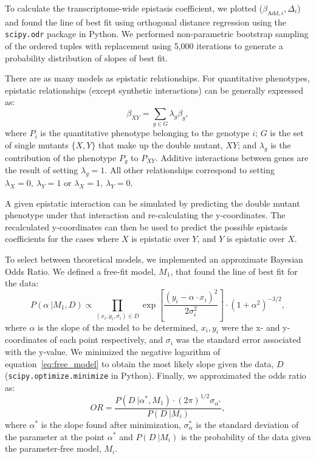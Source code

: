 \documentclass[9pt,twocolumn,twoside,lineno]{pnas-new}
\begin{document}
{To calculate the transcriptome-wide epistasis coefficient, we plotted
($\beta_{\mathrm{Add},i}, \Delta_i$) and found the line of best fit using
orthogonal distance regression using the \texttt{scipy.odr} package in Python.
We performed non-parametric bootstrap sampling of the ordered tuples with
replacement using 5,000 iterations to generate a probability distribution of
slopes of best fit.

There are as many models as epistatic relationships. For quantitative phenotypes,
epistatic relationships (except synthetic interactions) can be generally expressed
as:
\begin{equation}
  \beta_{XY} = \sum_{g\in G} \lambda_g \beta_g,
  \label{eq:epi}
\end{equation}
where $P_i$ is the quantitative phenotype belonging to the genotype $i$; $G$ is
the set of single mutants $\{X, Y\}$ that make up the double mutant, $XY$; and
$\lambda_g$ is the contribution of the phenotype $P_g$ to $P_{XY}$. Additive
interactions between genes are the result of setting $\lambda_g=1$. All other
relationships correspond to setting  $\lambda_X=0,~\lambda_Y=1$ or
$\lambda_X=1,~\lambda_Y=0$.

A given epistatic interaction can be simulated by predicting the double mutant
phenotype under that interaction and re-calculating the y-coordinates. The
recalculated y-coordinates can then be used to predict the possible epistasis
coefficients for the cases where $X$ is epistatic over $Y$, and $Y$ is epistatic
over $X$.

To select between theoretical models, we implemented an approximate Bayesian
Odds Ratio. We defined a free-fit model, $M_1$, that found the line of best fit
for the data:
\begin{equation}
  P(\alpha~|M_1, D) \propto \prod_{(x_i, y_i, \sigma_i)\in D}
  \exp{
       [\frac{{(y_i - \alpha\cdot x_i)}^2} %
            {2\sigma_i^2}] %
      } \cdot {(1+\alpha^2)}^{-3/2},
  \label{eq:free_model}
\end{equation}
where $\alpha$ is the slope of the model to be determined, $x_i, y_i$ were the
x- and y-coordinates of each point respectively, and $\sigma_i$ was the standard
error associated with the y-value. We minimized the
negative logarithm of equation~\ref{eq:free_model} to obtain the most likely
slope given the data, $D$ (\texttt{scipy.optimize.minimize} in Python). Finally,
we approximated the odds ratio as:
\begin{equation}
  OR = \frac{
  P(D~|\alpha^*, M_1)\cdot {(2\pi)}^{1/2}\sigma_{\alpha^*} %
  }{P(D~| M_i)}, %
\end{equation}
where $\alpha^*$ is the slope found after minimization, $\sigma_\alpha^*$ is the
standard deviation of the parameter at the point $\alpha^*$ and $P(D~|M_i)$ is the
probability of the data given the parameter-free model, $M_i$.

}
\end{document}
